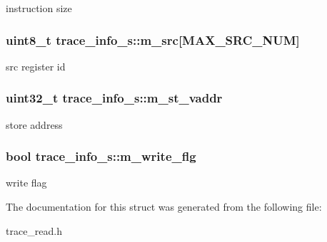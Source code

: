 \label{structtrace__info__s_af246dd2207021ddead1cd63178952876}
instruction size \hypertarget{structtrace__info__s_a4aa9dacb8b90ff9b43c6dd8109b91a8b}{
\subsubsection[{m\_\-src}]{\setlength{\rightskip}{0pt plus 5cm}uint8\_\-t {\bf trace\_\-info\_\-s::m\_\-src}\mbox{[}MAX\_\-SRC\_\-NUM\mbox{]}}}
\label{structtrace__info__s_a4aa9dacb8b90ff9b43c6dd8109b91a8b}
src register id \hypertarget{structtrace__info__s_aee7bd57efb508304b79e927e0128a356}{
\subsubsection[{m\_\-st\_\-vaddr}]{\setlength{\rightskip}{0pt plus 5cm}uint32\_\-t {\bf trace\_\-info\_\-s::m\_\-st\_\-vaddr}}}
\label{structtrace__info__s_aee7bd57efb508304b79e927e0128a356}
store address \hypertarget{structtrace__info__s_ac3d6c1d7e81fa33ed2b46e87ed6a0ed7}{
\subsubsection[{m\_\-write\_\-flg}]{\setlength{\rightskip}{0pt plus 5cm}bool {\bf trace\_\-info\_\-s::m\_\-write\_\-flg}}}
\label{structtrace__info__s_ac3d6c1d7e81fa33ed2b46e87ed6a0ed7}
write flag 

The documentation for this struct was generated from the following file:\begin{DoxyCompactItemize}
\item 
trace\_\-read.h\end{DoxyCompactItemize}

